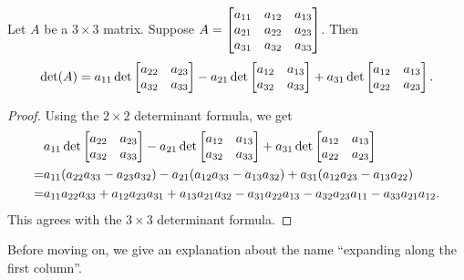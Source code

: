 \begin{theorem}
	Let $A$ be a $3\times 3$ matrix. Suppose
	$A=\mat{a_{11} & a_{12} & a_{13} \\ a_{21} & a_{22} & a_{23} \\ a_{31} & a_{32} & a_{33}}$.
	Then
	\[
		\det(A)=a_{11}\det\mat{a_{22} & a_{23} \\ a_{32} & a_{33}}-a_{21}\det\mat{a_{12} & a_{13} \\ a_{32} & a_{33}}+a_{31}\det\mat{a_{12} & a_{13} \\ a_{22} & a_{23}}.
	\]
\end{theorem}
\begin{proof}
	Using the $2\times 2$ determinant formula, we get
	\begin{align*}
		  & a_{11}\det\mat{a_{22} & a_{23} \\ a_{32} & a_{33}}-a_{21}\det\mat{a_{12} & a_{13} \\ a_{32} & a_{33}}+a_{31}\det\mat{a_{12} & a_{13} \\ a_{22} & a_{23}} \\
		= & a_{11}(a_{22}a_{33}-a_{23}a_{32})-a_{21}(a_{12}a_{33}-a_{13}a_{32})+a_{31}(a_{12}a_{23}-a_{13}a_{22})                                                    \\
		= & a_{11}a_{22}a_{33}+a_{12}a_{23}a_{31}+a_{13}a_{21}a_{32}-a_{31}a_{22}a_{13}-a_{32}a_{23}a_{11}-a_{33}a_{21}a_{12}.
	\end{align*}
	This agrees with the $3\times 3$ determinant formula.
\end{proof}

Before moving on, we give an explanation about the name ``expanding along the first
column''.

